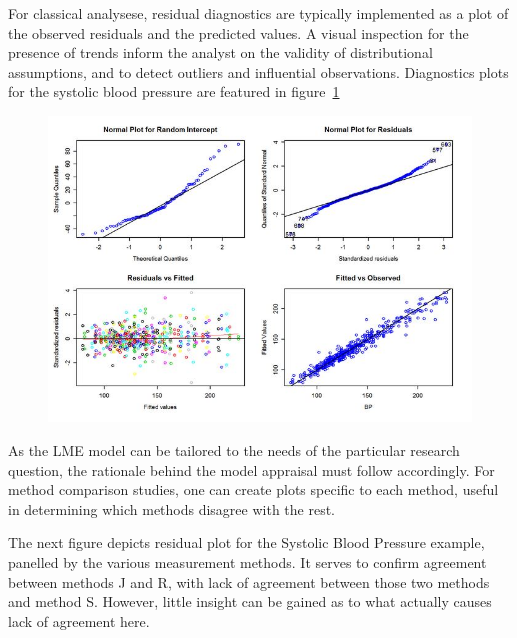 \documentclass[]{report}
\begin{document}
For classical analysese, residual diagnostics are typically implemented as a plot of the observed residuals and the predicted values. A visual inspection for the presence of trends inform the analyst on the validity of distributional assumptions, and to detect outliers and influential observations. Diagnostics plots for the systolic blood pressure are featured in figure~\ref{fig:ResidPlot}
	
\begin{figure}[h!]
	\centering
	\includegraphics[width=0.9\linewidth]{images/ResidPlot}
	\caption{}
	\label{fig:ResidPlot}
\end{figure}

As the LME model can be tailored to the needs of the particular research question, the rationale behind the model appraisal must follow accordingly. 
For method comparison studies, one can create plots specific to each method, useful in determining which methods disagree with the rest.
 	
	

	

The next figure depicts residual plot for the Systolic Blood Pressure example, panelled by the various measurement methods. It serves to confirm agreement between methods J and R, with lack of agreement between those two methods and method S. However, little insight can be gained as to what actually causes lack of agreement here. 
\end{document}
